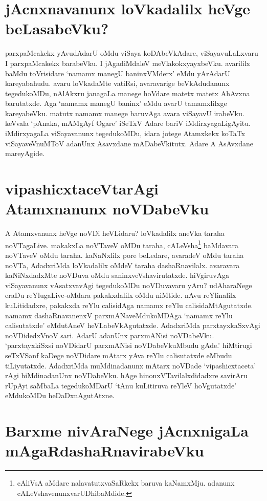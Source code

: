 \section*{jAcnxnavanunx loVkadalilx heVge beLasabeVku?}

parxpaMcakekx yAvudAdarU oMdu viSaya koDAbeVkAdare, viSayavuLaLxvaru I parxpaMcakekx barabeVku. I jAgadiMdaleV meVlakokxyayxbeVku. avarililx baMdu toVrisidare `namamx manegU baninxVMderx' eMdu yArAdarU kareyabahudu. avaru loVkadaMte vatiRsi, avaravarige beVkAdudanunx tegedukoMDu, nAlAkxru janagaLa manege hoVdare matetx matetx AhAvxna barutatxde. Aga `namamx manegU baninx' eMdu avarU tamamxlilxge kareyabeVku. matutx namamx manege baruvAga avara viSayavU irabeVku. keVvala `pAnaka, mAMgAyf Ogare' iSeTxV Adare bariV iMdirxyagaLigAyitu. iMdirxyagaLa viSayavanunx tegedukoMDu, idara jotege Atamxkekx koTaTx viSayaveVnuMToV adanUnx Asavxdane mADabeVkitutx. Adare A AsAvxdane mareyAgide.

\section*{vipashicxtaceVtarAgi Atamxnanunx noVDabeVku}

A Atamxvanunx heVge noVDi heVLidaru? loVkadalilx aneVka taraha noVTagaLive. makakxLa noVTaveV oMDu taraha, cALeVsha\footnote{cAliVsA aMdare nalavatutxvaSaRkekx baruva kaNamxMju. adanunx cALeVshavenunxvarUDhibaMdide.} baMdavara noVTaveV oMdu taraha. kaNaNxlilx pore beLedare, avaradeV oMdu taraha noVTa, AdadxriMda loVkadalilx oMdeV taraha dashaRnavilalx. avaravara kaNiNxdadxMte noVDuva oMdu saninxveVshavirutatxde. hiVgiruvAga viSayavanunx vAsatxvavAgi tegedukoMDu noVDuvavaru yAru? udAharaNege eraDu reYlugaLive-oMdara pakakxdalilx oMdu niMtide. nAvu reYlinalilx kuLitidadxre, pakakxda reYlu calisidAga namamx reYlu calisidaMtAgutatxde. namamx dashaRnavanenxV parxmANaveMdukoMDAga `namamx reYlu calisutatxde' eMdutAneV heVLabeVkAgutatxde. AdadxriMda parxtayxkaSxvAgi noVDidedxVnoV sari. AdarU adanUnx parxmANisi noVDabeVku. `parxtayxkiSxsi noVDidarU parxmANisi noVDabeVkuMbudu gAde.' hiMtirugi seTxVSanf kaDege noVDidare mAtarx yAva reYlu calisutatxde eMbudu tiLiyutatxde. AdadxriMda muMdinadanunx mAtarx noVDade `vipashicxtaceta' rAgi hiMdinadanUnx noVDabeVku. hAge hinonxVTavilalxdidadxre savirAru rUpAyi saMbaLa tegedukoMDarU `tAnu kuLitiruva reYleV hoVgutatxde' eMdukoMDu heDaDxnAgutAtxne.

\section*{Barxme nivAraNege jAcnxnigaLa mAgaRdashaRnavirabeVku}

